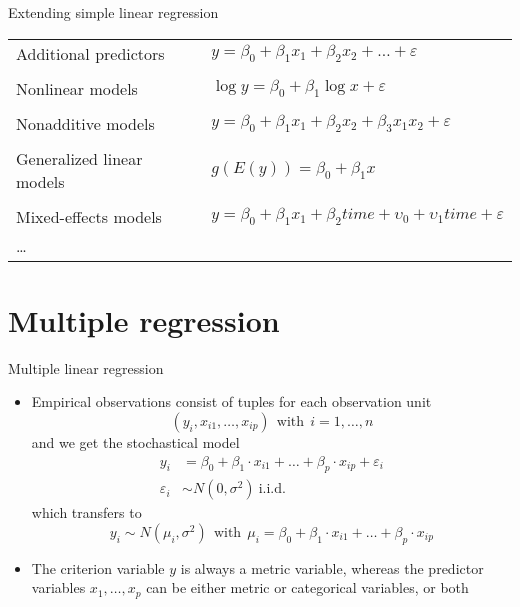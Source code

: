 \documentclass{beamer}
\begin{document}
\begin{frame}{Extending simple linear regression}
  \begin{tabular}{ll}
    Additional predictors &
      $y = \beta_0 + \beta_1 x_1 + \beta_2 x_2 + \dots +
      \varepsilon$\\
      & \\
    Nonlinear models &
      $\log y = \beta_0 + \beta_1 \log x + \varepsilon$\\
      & \\
    Nonadditive models &
      $y = \beta_0 + \beta_1 x_1 + \beta_2 x_2 + \beta_3
      x_1 x_2 + \varepsilon$\\
      & \\
    Generalized linear models &
      $g(E(y)) = \beta_0 + \beta_1 x$\\
      & \\
    Mixed-effects models &
      $y = \beta_0 + \beta_1 x_1 + \beta_2 time + 
      \upsilon_0 + \upsilon_1 time + \varepsilon$\\
      \dots & \\
  \end{tabular}
\end{frame}

\section{Multiple regression}

\begin{frame}{Multiple linear regression}
  \begin{itemize}
    \item Empirical observations consist of tuples for each observation
      unit
\[
  (y_i, x_{i1}, \ldots, x_{ip}) ~~\text{with}~~ i = 1, \ldots, n
\]
and we get the stochastical model
\begin{align*}
  y_i & = \beta_0 + \beta_1 \cdot x_{i1} + \ldots + \beta_p \cdot x_{ip} +
        \varepsilon_i \\
  \varepsilon_i & \sim N (0, \sigma^2)~\text{i.i.d.}
\end{align*}
which transfers to
\[
  y_i \sim N (\mu_i, \sigma^2) ~~\text{with}~~
  \mu_i = \beta_0 + \beta_1 \cdot x_{i1} + \ldots + \beta_p \cdot x_{ip}
\]\vspace{-.7cm}
\item The criterion variable $y$ is always a metric variable, whereas the
  predictor variables $x_1, \ldots, x_p$ can be either metric or
      categorical variables, or both
  \end{itemize}
\end{frame}
\end{document}
